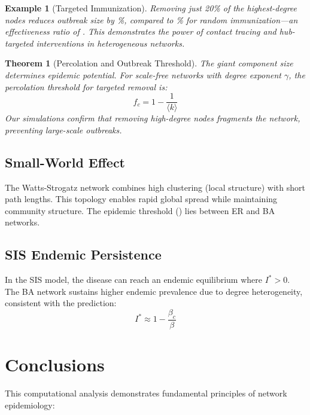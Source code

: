 \documentclass[a4paper, 11pt]{article}
\newtheorem{theorem}{Theorem}[section]
\newtheorem{example}{Example}[section]
\begin{document}
\begin{example}[Targeted Immunization]
Removing just 20\% of the highest-degree nodes reduces outbreak size by
\%, compared to \% for
random immunization—an effectiveness ratio of .
This demonstrates the power of contact tracing and hub-targeted interventions in heterogeneous networks.
\end{example}

\begin{theorem}[Percolation and Outbreak Threshold]
The giant component size determines epidemic potential. For scale-free networks with
degree exponent $\gamma$, the percolation threshold for targeted removal is:
\begin{equation}
f_c = 1 - \frac{1}{\langle k \rangle}
\end{equation}
Our simulations confirm that removing high-degree nodes fragments the network, preventing
large-scale outbreaks.
\end{theorem}

\subsection{Small-World Effect}

The Watts-Strogatz network combines high clustering (local structure) with short path lengths.
This topology enables rapid global spread while maintaining community structure. The epidemic
threshold () lies between ER and BA networks.

\subsection{SIS Endemic Persistence}

In the SIS model, the disease can reach an endemic equilibrium where $I^* > 0$. The BA network
sustains higher endemic prevalence due to degree heterogeneity, consistent with the prediction:
\begin{equation}
I^* \approx 1 - \frac{\beta_c}{\beta}
\end{equation}

\section{Conclusions}

This computational analysis demonstrates fundamental principles of network epidemiology:
\end{document}

